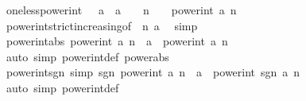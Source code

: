 \begin{isabellebody}
\ one{\isacharunderscore}{\kern0pt}less{\isacharunderscore}{\kern0pt}power{\isacharunderscore}{\kern0pt}int{\isacharcolon}{\kern0pt}\ {\isachardoublequoteopen}{}\ {\isacharless}{\kern0pt}\ {\isacharparenleft}{\kern0pt}a\ {\isacharcolon}{\kern0pt}{\isacharcolon}{\kern0pt}\ {\isacharprime}{\kern0pt}a{\isacharparenright}{\kern0pt}\ {\isasymLongrightarrow}\ {}\ {\isacharless}{\kern0pt}\ n\ {\isasymLongrightarrow}\ {}\ {\isacharless}{\kern0pt}\ power{\isacharunderscore}{\kern0pt}int\ a\ n{\isachardoublequoteclose}\isanewline
%
\isadelimproof
\ \ %
\endisadelimproof
%
\isatagproof
{}\isamarkupfalse%
\ power{\isacharunderscore}{\kern0pt}int{\isacharunderscore}{\kern0pt}strict{\isacharunderscore}{\kern0pt}increasing{\isacharbrackleft}{\kern0pt}of\ {}\ n\ a{\isacharbrackright}{\kern0pt}\ \isamarkupfalse%
\ simp%
\endisatagproof
{\isafoldproof}%
%
\isadelimproof
\isanewline
%
\endisadelimproof
\isanewline
{}\isamarkupfalse%
\ power{\isacharunderscore}{\kern0pt}int{\isacharunderscore}{\kern0pt}abs{\isacharcolon}{\kern0pt}\ {\isachardoublequoteopen}{\isasymbar}power{\isacharunderscore}{\kern0pt}int\ a\ n\ {\isacharcolon}{\kern0pt}{\isacharcolon}{\kern0pt}\ {\isacharprime}{\kern0pt}a{\isasymbar}\ {\isacharequal}{\kern0pt}\ power{\isacharunderscore}{\kern0pt}int\ {\isasymbar}a{\isasymbar}\ n{\isachardoublequoteclose}\isanewline
%
\isadelimproof
\ \ %
\endisadelimproof
%
\isatagproof
{}\isamarkupfalse%
\ {\isacharparenleft}{\kern0pt}auto\ simp{\isacharcolon}{\kern0pt}\ power{\isacharunderscore}{\kern0pt}int{\isacharunderscore}{\kern0pt}def\ power{\isacharunderscore}{\kern0pt}abs{\isacharparenright}{\kern0pt}%
\endisatagproof
{\isafoldproof}%
%
\isadelimproof
\isanewline
%
\endisadelimproof
\isanewline
{}\isamarkupfalse%
\ power{\isacharunderscore}{\kern0pt}int{\isacharunderscore}{\kern0pt}sgn\ {\isacharbrackleft}{\kern0pt}simp{\isacharbrackright}{\kern0pt}{\isacharcolon}{\kern0pt}\ {\isachardoublequoteopen}sgn\ {\isacharparenleft}{\kern0pt}power{\isacharunderscore}{\kern0pt}int\ a\ n\ {\isacharcolon}{\kern0pt}{\isacharcolon}{\kern0pt}\ {\isacharprime}{\kern0pt}a{\isacharparenright}{\kern0pt}\ {\isacharequal}{\kern0pt}\ power{\isacharunderscore}{\kern0pt}int\ {\isacharparenleft}{\kern0pt}sgn\ a{\isacharparenright}{\kern0pt}\ n{\isachardoublequoteclose}\isanewline
%
\isadelimproof
\ \ %
\endisadelimproof
%
\isatagproof
{}\isamarkupfalse%
\ {\isacharparenleft}{\kern0pt}auto\ simp{\isacharcolon}{\kern0pt}\ power{\isacharunderscore}{\kern0pt}int{\isacharunderscore}{\kern0pt}def{\isacharparenright}{\kern0pt}%

\end{isabellebody}
